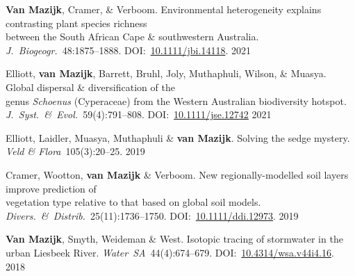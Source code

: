 \begin{hangparas}{2em}{1}

\textbf{Van Mazijk}, Cramer, \& Verboom.
Environmental heterogeneity explains contrasting plant species richness \\
\hspace{2em} between the South African Cape \& southwestern Australia. \\
\hspace{2em} \textit{J.~Biogeogr.}~48:1875--1888.
DOI:~\href{https://doi.org/10.1111/jbi.14118}{10.1111/jbi.14118}. \hfill 2021

Elliott, \textbf{van Mazijk}, Barrett, Bruhl,
Joly, Muthaphuli, Wilson, \& Muasya.
Global dispersal \& diversification of the \\
\hspace{2em} genus \textit{Schoenus} (Cyperaceae)
  from the Western Australian biodiversity hotspot. \\
\hspace{2em} \textit{J.~Syst.~\&~Evol.}~59(4):791--808.
DOI:~\href{https://doi.org/10.1111/jse.1274}{10.1111/jse.12742} \hfill 2021

Elliott, Laidler, Muasya, Muthaphuli \& \textbf{van Mazijk}.
Solving the sedge mystery.
\textit{Veld \& Flora}~105(3):20--25. \hfill 2019

Cramer, Wootton, \textbf{van Mazijk} \& Verboom.
New regionally-modelled soil layers improve prediction of \\
\hspace{2em} vegetation type
  relative to that based on global soil models. \\
\hspace{2em} \textit{Divers.~\&~Distrib.}~25(11):1736--1750.
DOI:~\href{https://doi.org/10.1111/ddi.12973}{10.1111/ddi.12973}. \hfill 2019

\textbf{Van Mazijk}, Smyth, Weideman \& West.
Isotopic tracing of stormwater in the urban Liesbeek River.
\textit{Water~SA}~44(4):674--679.
DOI:~\href{https://doi.org/10.4314/wsa.v44i4.16}{10.4314/wsa.v44i4.16}. \hfill 2018

\end{hangparas}
